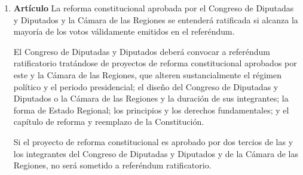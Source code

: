 \documentclass[11pt, a4paper]{article}
\begin{document}
\begin{enumerate}
\item \textbf{Artículo} \newline
La reforma constitucional aprobada por el Congreso de Diputadas y Diputados y la Cámara de las Regiones se entenderá ratificada si alcanza la mayoría de los votos válidamente emitidos en el referéndum. 

El Congreso de Diputadas y Diputados deberá convocar a referéndum ratificatorio tratándose de proyectos de reforma constitucional aprobados por este y la Cámara de las Regiones, que alteren sustancialmente el régimen político y el periodo presidencial; el diseño del Congreso de Diputadas y Diputados o la Cámara de las Regiones y la duración de sus integrantes; la forma de Estado Regional; los principios y los derechos fundamentales; y el capítulo de reforma y reemplazo de la Constitución. 

Si el proyecto de reforma constitucional es aprobado por dos tercios de las y los integrantes del Congreso de Diputadas y Diputados y de la Cámara de las Regiones, no será sometido a referéndum ratificatorio. 


\end{enumerate}
\end{document}

